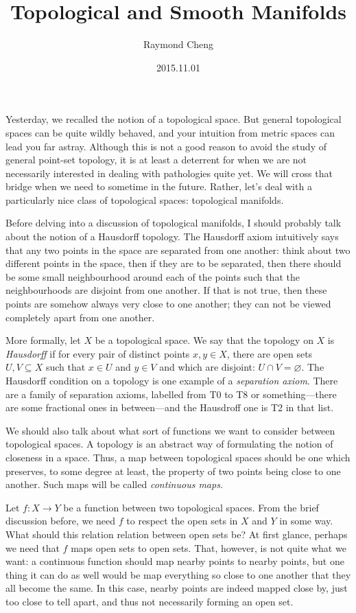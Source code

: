 \documentclass{axolotl}
\title{Topological and Smooth Manifolds}
\author{Raymond Cheng}
\date{2015.11.01}
\begin{document}
\maketitle
Yesterday, we recalled the notion of a topological space. But general
topological spaces can be quite wildly behaved, and your intuition from metric
spaces can lead you far astray. Although this is not a good reason to avoid the
study of general point-set topology, it is at least a deterrent for when we are
not necessarily interested in dealing with pathologies quite yet. We will cross
that bridge when we need to sometime in the future. Rather, let's deal with a
particularly nice class of topological spaces: topological manifolds.

Before delving into a discussion of topological manifolds, I should probably
talk about the notion of a Hausdorff topology. The Hausdorff axiom intuitively
says that any two points in the space are separated from one another: think
about two different points in the space, then if they are to be separated, then
there should be some small neighbourhood around each of the points such that
the neighbourhoods are disjoint from one another. If that is not true, then
these points are somehow always very close to one another; they can not be
viewed completely apart from one another.

More formally, let \(X\) be a topological space. We say that the topology on
\(X\) is \textit{Hausdorff} if for every pair of distinct points \(x,y \in X\),
there are open sets \(U,V \subseteq X\) such that \(x \in U\) and \(y \in V\)
and which are disjoint: \(U \cap V = \varnothing\). The Hausdorff condition on
a topology is one example of a \textit{separation axiom}. There are a family of
separation axioms, labelled from T0 to T8 or something---there are some
fractional ones in between---and the Hausdroff one is T2 in that list.

We should also talk about what sort of functions we want to consider between
topological spaces. A topology is an abstract way of formulating the notion of
closeness in a space. Thus, a map between topological spaces should be one
which preserves, to some degree at least, the property of two points being
close to one another. Such maps will be called \textit{continuous maps}.

Let \(f: X \to Y\) be a function between two topological spaces. From the
brief discussion before, we need \(f\) to respect the open sets in \(X\) and
\(Y\) in some way. What should this relation relation between open sets be? At
first glance, perhaps we need that \(f\) maps open sets to open sets. That,
however, is not quite what we want: a continuous function should map nearby
points to nearby points, but one thing it can do as well would be map
everything so close to one another that they all become the same. In this case,
nearby points are indeed mapped close by, just too close to tell apart, and
thus not necessarily forming an open set.
\end{document}
